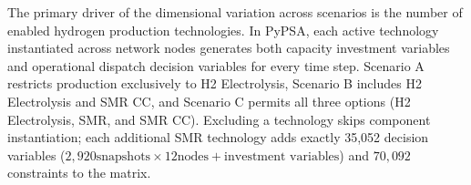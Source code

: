 \documentclass[preprint,12pt]{elsarticle}
\begin{document}
The primary driver of the dimensional variation across scenarios is the number of enabled hydrogen production technologies. In PyPSA, each active technology instantiated across network nodes generates both capacity investment variables and operational dispatch decision variables for every time step. Scenario A restricts production exclusively to \textsf{H2 Electrolysis}, Scenario B includes \textsf{H2 Electrolysis} and \textsf{SMR CC}, and Scenario C permits all three options (\textsf{H2 Electrolysis}, \textsf{SMR}, and \textsf{SMR CC}). Excluding a technology skips component instantiation; each additional SMR technology adds exactly 35,052 decision variables ($2,920 \text{snapshots} \times 12 \text{nodes} + \text{investment variables}$) and $70,092$ constraints to the matrix.




\end{document}
